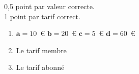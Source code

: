 %
%
    0,5 point par valeur correcte.\\
    1 point par tarif correct.
    \begin{enumerate}
        \item $\bm{a} = 10$~€\hfill
              $\bm{b} = 20$~€\hfill
              $\bm{c} = 5$~€\hfill
              $\bm{d} = 60$~€
        \item Le tarif membre
        \item Le tarif abonné
    \end{enumerate}
